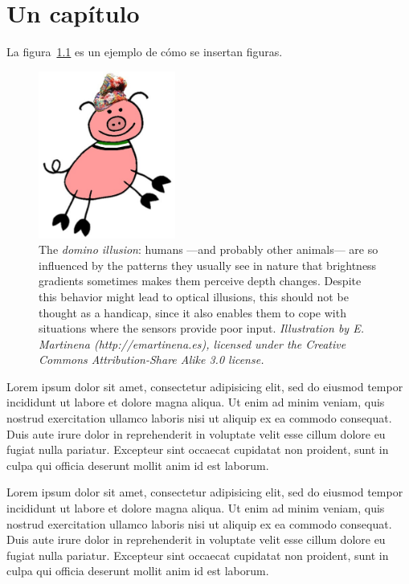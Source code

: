 \chapter{Un capítulo}

La figura~\ref{fig:shadows} es un ejemplo de cómo se insertan figuras.

\begin{figure}[thbp]
 \centering
 \includegraphics[width=0.4\textwidth]{img/figure.jpg}
 \caption{The \textit{domino illusion}: humans ---and probably other animals--- are so influenced by the patterns they usually see in nature that brightness gradients sometimes makes them perceive depth changes. Despite this behavior might lead to optical illusions, this should not be thought as a handicap, since it also enables them to cope with situations where the sensors provide poor input. \textit{Illustration by E. Martinena (http://emartinena.es), licensed under the Creative Commons Attribution-Share Alike 3.0 license.} }
 \label{fig:shadows}
\end{figure}

\par
Lorem ipsum dolor sit amet, consectetur adipisicing elit, sed do eiusmod tempor incididunt ut labore et dolore magna aliqua. Ut enim ad minim veniam, quis nostrud exercitation ullamco laboris nisi ut aliquip ex ea commodo consequat. Duis aute irure dolor in reprehenderit in voluptate velit esse cillum dolore eu fugiat nulla pariatur. Excepteur sint occaecat cupidatat non proident, sunt in culpa qui officia deserunt mollit anim id est laborum.

\par
Lorem ipsum dolor sit amet, consectetur adipisicing elit, sed do eiusmod tempor incididunt ut labore et dolore magna aliqua. Ut enim ad minim veniam, quis nostrud exercitation ullamco laboris nisi ut aliquip ex ea commodo consequat. Duis aute irure dolor in reprehenderit in voluptate velit esse cillum dolore eu fugiat nulla pariatur. Excepteur sint occaecat cupidatat non proident, sunt in culpa qui officia deserunt mollit anim id est laborum.
